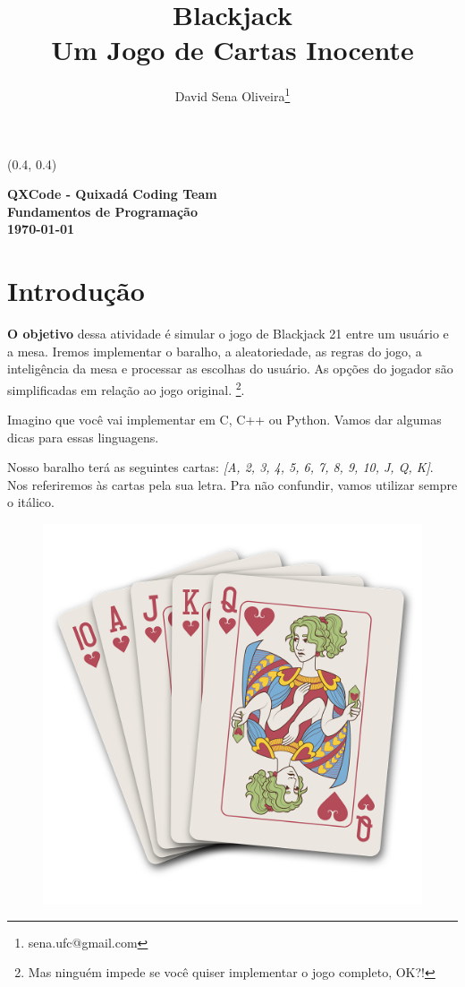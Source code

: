 \documentclass[12pt]{article}
\newcommand{\ita}[1]{\textit{#1}}  %
\newcommand{\note}[1]{\footnote{#1}} %
\newcommand{\caps}[1]{\textbf{#1}} %
\begin{document}
\begin{textblock}{15}(0.4, 0.4)
\noindent
\begin{center}
\LARGE{\bf{QXCode - Quixadá Coding Team}}\\
\large{\bf{Fundamentos de Programação}} \\
\large{\bf{\today}}
\end{center}
\end{textblock}

\title{\bf{Blackjack \\ Um Jogo de Cartas Inocente}}

\author{
David Sena Oliveira\thanks{sena.ufc@gmail.com}
}

\date{}

\maketitle
\thispagestyle{empty}

\section{Introdução}

\caps{O objetivo} dessa atividade é simular o jogo de Blackjack 21 entre um usuário e a mesa. Iremos implementar o baralho, a aleatoriedade, as regras do jogo, a inteligência da mesa e processar as escolhas do usuário. As opções do jogador são simplificadas em relação ao jogo original. \note{Mas ninguém impede se você quiser implementar o jogo completo, OK?!}. 

Imagino que você vai implementar em C, C++ ou Python. Vamos dar algumas dicas para essas linguagens.

Nosso baralho terá as seguintes cartas: 
\ita{[A, 2, 3, 4, 5, 6, 7, 8, 9, 10, J, Q, K]}. 
Nos referiremos às cartas pela sua letra. Pra não confundir, vamos utilizar sempre o itálico.



\begin{figure}[h]
\centering
\includegraphics[width=0.3\linewidth]{./imagens/blackjack}
\end{figure}
\end{document}
